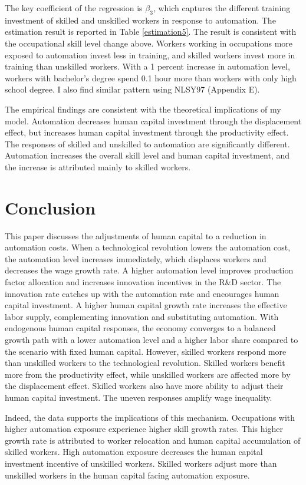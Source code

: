 \documentclass[12pt]{article}
\begin{document}
The key coefficient of the regression is $\beta_3$, which captures the different training investment of skilled and unskilled workers in response to automation. The estimation result is reported in Table \ref{estimation5}. The result is consistent with the occupational skill level change above. Workers working in occupations more exposed to automation invest less in training, and skilled workers invest more in training than unskilled workers. With a 1 percent increase in automation level, workers with bachelor's degree spend 0.1 hour more than workers with only high school degree. I also find similar pattern using NLSY97 (Appendix E).

The empirical findings are consistent with the theoretical implications of my model. Automation decreases human capital investment through the displacement effect, but increases human capital investment through the productivity effect. The responses of skilled and unskilled to automation are significantly different. Automation increases the overall skill level and human capital investment, and the increase is attributed mainly to skilled workers. 

\section{Conclusion}
This paper discusses the adjustments of human capital to a reduction in automation costs. When a technological revolution lowers the automation cost, the automation level increases immediately, which displaces workers and decreases the wage growth rate. A higher automation level improves production factor allocation and increases innovation incentives in the R\&D sector. The innovation rate catches up with the automation rate and encourages human capital investment. A higher human capital growth rate increases the effective labor supply, complementing innovation and substituting automation. With endogenous human capital responses, the economy converges to a balanced growth path with a lower automation level and a higher labor share compared to the scenario with fixed human capital. However, skilled workers respond more than unskilled workers to the technological revolution. Skilled workers benefit more from the productivity effect, while unskilled workers are affected more by the displacement effect. Skilled workers also have more ability to adjust their human capital investment. The uneven responses amplify wage inequality.

Indeed, the data supports the implications of this mechanism. Occupations with higher automation exposure experience higher skill growth rates. This higher growth rate is attributed to worker relocation and human capital accumulation of skilled workers. High automation exposure decreases the human capital investment incentive of unskilled workers. Skilled workers adjust more than unskilled workers in the human capital facing automation exposure. 
\end{document}
